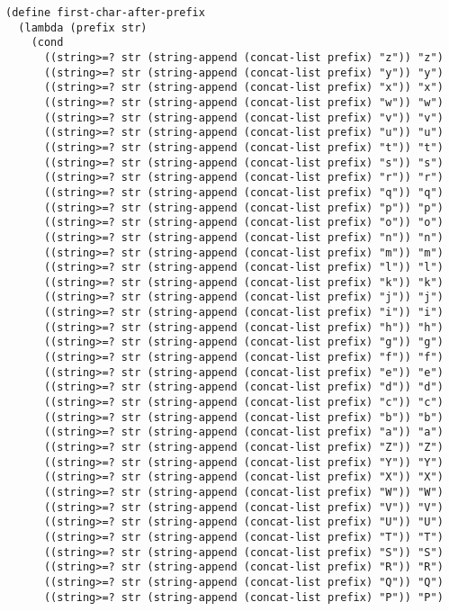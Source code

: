 \documentclass[a4paper,12pt]{article}
\begin{document}
\begin{verbatim}
(define first-char-after-prefix
  (lambda (prefix str)
    (cond
      ((string>=? str (string-append (concat-list prefix) "z")) "z")
      ((string>=? str (string-append (concat-list prefix) "y")) "y")
      ((string>=? str (string-append (concat-list prefix) "x")) "x")
      ((string>=? str (string-append (concat-list prefix) "w")) "w")
      ((string>=? str (string-append (concat-list prefix) "v")) "v")
      ((string>=? str (string-append (concat-list prefix) "u")) "u")
      ((string>=? str (string-append (concat-list prefix) "t")) "t")
      ((string>=? str (string-append (concat-list prefix) "s")) "s")
      ((string>=? str (string-append (concat-list prefix) "r")) "r")
      ((string>=? str (string-append (concat-list prefix) "q")) "q")
      ((string>=? str (string-append (concat-list prefix) "p")) "p")
      ((string>=? str (string-append (concat-list prefix) "o")) "o")
      ((string>=? str (string-append (concat-list prefix) "n")) "n")
      ((string>=? str (string-append (concat-list prefix) "m")) "m")
      ((string>=? str (string-append (concat-list prefix) "l")) "l")
      ((string>=? str (string-append (concat-list prefix) "k")) "k")
      ((string>=? str (string-append (concat-list prefix) "j")) "j")
      ((string>=? str (string-append (concat-list prefix) "i")) "i")
      ((string>=? str (string-append (concat-list prefix) "h")) "h")
      ((string>=? str (string-append (concat-list prefix) "g")) "g")
      ((string>=? str (string-append (concat-list prefix) "f")) "f")
      ((string>=? str (string-append (concat-list prefix) "e")) "e")
      ((string>=? str (string-append (concat-list prefix) "d")) "d")
      ((string>=? str (string-append (concat-list prefix) "c")) "c")
      ((string>=? str (string-append (concat-list prefix) "b")) "b")
      ((string>=? str (string-append (concat-list prefix) "a")) "a")
      ((string>=? str (string-append (concat-list prefix) "Z")) "Z")
      ((string>=? str (string-append (concat-list prefix) "Y")) "Y")
      ((string>=? str (string-append (concat-list prefix) "X")) "X")
      ((string>=? str (string-append (concat-list prefix) "W")) "W")
      ((string>=? str (string-append (concat-list prefix) "V")) "V")
      ((string>=? str (string-append (concat-list prefix) "U")) "U")
      ((string>=? str (string-append (concat-list prefix) "T")) "T")
      ((string>=? str (string-append (concat-list prefix) "S")) "S")
      ((string>=? str (string-append (concat-list prefix) "R")) "R")
      ((string>=? str (string-append (concat-list prefix) "Q")) "Q")
      ((string>=? str (string-append (concat-list prefix) "P")) "P")

\end{verbatim}
\end{document}
